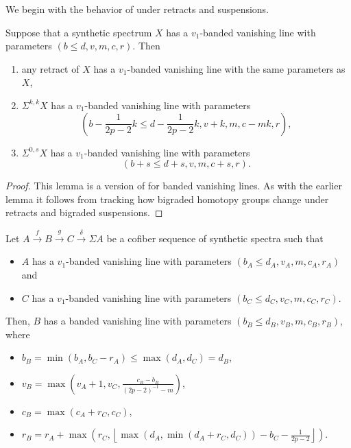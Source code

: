 We begin with the behavior of  under retracts and suspensions.

\begin{lem} \label{lemm:band-retract-susp}
  Suppose that a synthetic spectrum $X$ has a $v_1$-banded vanishing line with parameters $(b \leq d, v, m, c, r)$. Then
  \begin{enumerate}
  \item any retract of $X$ has a $v_1$-banded vanishing line with the same parameters as $X$,
  \item $\Sigma^{k,k} X$ has a $v_1$-banded vanishing line with parameters
    $$ \left( b - \frac{1}{2p-2} k \leq d - \frac{1}{2p-2} k, v + k, m, c - mk, r \right), $$
  \item $\Sigma^{0,s} X$ has a $v_1$-banded vanishing line with parameters
    $$ ( b + s \leq d + s, v, m, c + s, r). $$
  \end{enumerate}
\end{lem}

\begin{proof}
  This lemma is a version of  for banded vanishing lines.
  As with the earlier lemma it follows from tracking how bigraded homotopy groups change under retracts and bigraded suspensions.
\end{proof}


\begin{prop} \label{prop:band-in-cofiber-seqs}
  Let $A \xrightarrow{f} B \xrightarrow{g} C \xrightarrow{\delta} \Sigma A$ be a cofiber sequence of synthetic spectra such that
  \begin{itemize}
  \item $A$ has a $v_1$-banded vanishing line with parameters $(b_A \leq d_A, v_A, m, c_A, r_A)$ and
  \item $C$ has a $v_1$-banded vanishing line with parameters $(b_C \leq d_C, v_C, m, c_C, r_C)$.
  \end{itemize}
  Then, $B$ has a banded vanishing line with parameters $(b_B \leq d_B, v_B, m, c_B, r_B)$, where
  \begin{itemize}
  \item $b_B = \min(b_A, b_C - r_A) \leq \max(d_A, d_C) = d_B$,
  \item $v_B = \max(v_A + 1,v_C, \frac{c_B - b_B}{(2p-2)^{-1}-m})$,
  \item $c_B = \max(c_A + r_C, c_C)$,
  \item $r_B = r_A + \max \left( r_C, \left\lfloor \max(d_A, \min(d_A + r_C, d_C)) - b_C - \frac{1}{2p-2} \right\rfloor \right)$.
  \end{itemize}
\end{prop}


